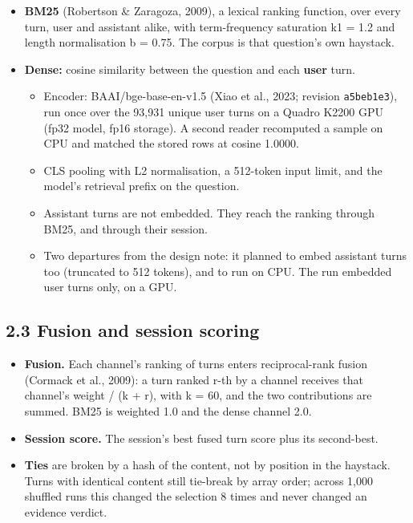 \documentclass[11pt]{article}
\providecommand{\tightlist}{\setlength{\itemsep}{0pt}\setlength{\parskip}{0pt}}
\begin{document}
\begin{itemize}
\tightlist
\item
  \textbf{BM25} (Robertson \& Zaragoza, 2009), a lexical ranking function, over every turn, user and assistant
  alike, with term-frequency saturation k1 = 1.2 and length normalisation b = 0.75. The corpus is that
  question's own haystack.
\item
  \textbf{Dense:} cosine similarity between the question and each \textbf{user} turn.

  \begin{itemize}
  \tightlist
  \item
    Encoder: BAAI/bge-base-en-v1.5 (Xiao et al., 2023; revision \texttt{a5beb1e3}), run once over the 93,931
    unique user turns on a Quadro K2200 GPU (fp32 model, fp16 storage). A second reader recomputed a
    sample on CPU and matched the stored rows at cosine 1.0000.
  \item
    CLS pooling with L2 normalisation, a 512-token input limit, and the model's retrieval prefix on the
    question.
  \item
    Assistant turns are not embedded. They reach the ranking through BM25, and through their session.
  \item
    Two departures from the design note: it planned to embed assistant turns too (truncated to 512
    tokens), and to run on CPU. The run embedded user turns only, on a GPU.
  \end{itemize}
\end{itemize}

\hypertarget{fusion-and-session-scoring}{%
\subsection{2.3 Fusion and session scoring}\label{fusion-and-session-scoring}}

\begin{itemize}
\tightlist
\item
  \textbf{Fusion.} Each channel's ranking of turns enters reciprocal-rank fusion (Cormack et al., 2009): a turn
  ranked r-th by a channel receives that channel's weight / (k + r), with k = 60, and the two contributions
  are summed. BM25 is weighted 1.0 and the dense channel 2.0.
\item
  \textbf{Session score.} The session's best fused turn score plus its second-best.
\item
  \textbf{Ties} are broken by a hash of the content, not by position in the haystack. Turns with identical
  content still tie-break by array order; across 1,000 shuffled runs this changed the selection 8 times and
  never changed an evidence verdict.
\end{itemize}
\end{document}

